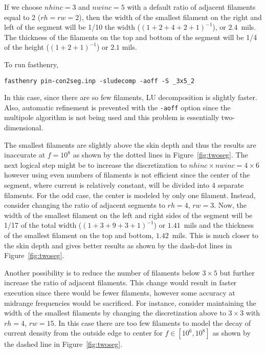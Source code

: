 If we choose $nhinc = 3$ and $nwinc = 5$ with a default ratio of
adjacent filaments equal to 2 ($rh = rw = 2$), then the width of the
smallest filament on the right and left of the segment will be 1/10
the width ($(1 + 2 + 4 + 2 + 1)^{-1}$), or $2.4$~mils.  The thickness
of the filaments on the top and bottom of the segment will be 1/4 of
the height ($(1 + 2 + 1)^{-1}$) or $2.1$ mils.  

To run fasthenry, 
\begin{verbatim}
fasthenry pin-con2seg.inp -sludecomp -aoff -S _3x5_2
\end{verbatim}
In this case, since there are so few filaments, LU decomposition is
slightly faster.  Also, automatic refinement is prevented with the
{\tt -aoff} option since the multipole algorithm is not being used
and this problem is essentially two-dimensional.

The smallest filaments are slightly above the skin depth and thus the
results are inaccurate at $f = 10^8$ as shown by the dotted lines in
Figure~\ref{fig:twoseg}.  The next logical step might be to increase
the discretization to $nhinc \times nwinc = 4 \times 6$ however using
even numbers of filaments is not efficient since the center of the
segment, where current is relatively constant, will be divided into 4
separate filaments.  For the odd case, the center is modeled by only
one filament.  Instead, consider changing the ratio of adjacent
segments to $rh = 4$, $rw = 3$.  Now, the width of the smallest
filament on the left and right sides of the segment will be 1/17 of
the total width ($(1 + 3 + 9 + 3 + 1)^{-1}$) or $1.41$~mils and the
thickness of the smallest filament on the top and bottom, $1.42$~mils.
This is much closer to the skin depth and gives better results as
shown by the dash-dot lines in Figure~\ref{fig:twoseg}.

Another possibility is to reduce the number of filaments below $3
\times 5$ but further increase the ratio of adjacent filaments.  This
change would result in faster execution since there would be fewer
filaments, however some accuracy at midrange frequencies would be
sacrificed.  For instance, consider maintaining the width of the
smallest filaments by changing the discretization above to $3 \times
3$ with $rh = 4$, $rw = 15$.  In this case there are too few filaments
to model the decay of current density from the outside edge to center
for $f \in [10^6,10^8]$ as shown by the dashed line 
in Figure~\ref{fig:twoseg}.

